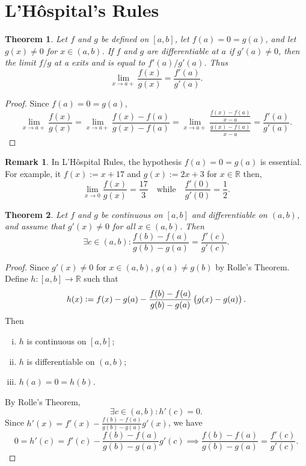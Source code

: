 \documentclass[12pt,openany]{book}
\newtheorem{theorem}{Theorem}[chapter]
\theoremstyle{definition}
\newtheorem{remark}{Remark}[chapter]
\newcommand{\R}{\mathbb{R}}
\begin{document}
	\section{L'H\^{o}spital's Rules}
	\begin{tcolorbox}[colback=white,colframe=thmcolor,arc=5pt,title={\color{white}\bf }]
		\begin{theorem}
			Let $f$ and $g$ be defined on $[a,b]$, let $f(a)=0=g(a)$, and let $g(x)\neq 0$ for $x\in(a,b)$. If $f$ and $g$ are differentiable at $a$ if $g'(a)\neq 0$, then the limit $f/g$ at a exits and is equal to $f'(a)/g'(a)$. Thus \[
			\lim\limits_{x\to a+}\frac{f(x)}{g(x)}=\frac{f'(a)}{g'(a)}.
			\]
		\end{theorem}
	\end{tcolorbox}
	\begin{proof}
		Since $f(a)=0=g(a)$, \[
		\lim\limits_{x\to a+}\frac{f(x)}{g(x)}=\lim\limits_{x\to a+}\frac{f(x)-f(a)}{g(x)-f(a)}=\lim\limits_{x\to a+}\frac{\frac{f(x)-f(a)}{x-a}}{\frac{g(x)-f(a)}{x-a}}=\frac{f'(a)}{g'(a)}.
		\]
	\end{proof}
	\vspace{10pt}
	\begin{remark}
		In L'H\^{o}spital Rules, the hypothesis $f(a)=0=g(a)$ is essential. For example, it $f(x):=x+17$ and $g(x):=2x+3$ for $x\in\R$ then, \[
		\lim\limits_{x\to 0}\frac{f(x)}{g(x)}=\frac{17}{3}\quad\text{while}\quad\frac{f'(0)}{g'(0)}=\frac{1}{2}.
		\]
	\end{remark}
	\vspace{20pt}
	\begin{tcolorbox}[colback=white,colframe=thmcolor,arc=5pt,title={\color{white}\bf Cauchy's Mean Value Thoerem of Differential Calculus}]
		\begin{theorem}
			Let $f$ and $g$ be continuous on $[a,b]$ and differentiable on $(a,b)$, and assume that $g'(x)\neq 0$ for all $x\in(a,b)$. Then \[
			\exists c\in(a,b):\frac{f(b)-f(a)}{g(b)-g(a)}=\frac{f'(c)}{g'(c)}.
			\]
		\end{theorem}
	\end{tcolorbox}
	\begin{proof}
		Since $g'(x)\neq 0$ for $x\in (a,b)$, $g(a)\neq g(b)$ by Rolle's Theorem. Define $h:[a,b]\to\R$ such that \[
		h(x):=f(x)-g(a)-\frac{f(b)-f(a)}{g(b)-g(a)}\del{g(x)-g(a)}.
		\] Then \begin{enumerate}[(i)]
			\item $h$ is continuous on $[a,b]$;
			\item $h$ is differentiable on $(a,b)$;
			\item $h(a)=0=h(b)$.
		\end{enumerate} By Rolle's Theorem, \[
		\exists c\in(a,b):h'(c)=0.
		\] Since $h'(x)=f'(x)-\frac{f(b)-f(a)}{g(b)-g(a)}g'(x)$, we have \[
		0=h'(c)=f'(c)-\frac{f(b)-f(a)}{g(b)-g(a)}g'(c)\implies\frac{f(b)-f(a)}{g(b)-g(a)}=\frac{f'(c)}{g'(c)}.
		\]
	\end{proof}
\end{document}
